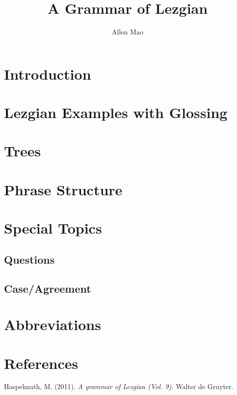 \documentclass[12pt, letterpaper]{article}
\title{A Grammar of Lezgian}
\author{Allen Mao}
\begin{document}
\maketitle
\section*{Introduction}

\section*{Lezgian Examples with Glossing}

\section{Trees}
\label{sec:trees}

\section{Phrase Structure}

\section{Special Topics}
\label{sec:spec-topics}
\subsection{Questions}

\subsection{Case/Agreement}

\section{Abbreviations}
\printglossaries
\section{References}
\begin{thebibliography}{}
Haspelmath, M. (2011). \textit{A grammar of Lezgian (Vol. 9).} Walter de Gruyter.

\end{thebibliography}
\end{document}
